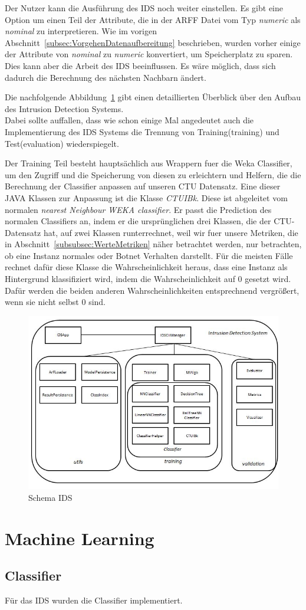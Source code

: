 \documentclass[main.tex]{subfiles}
\begin{document}
Der Nutzer kann die Ausführung des IDS noch weiter einstellen.
Es gibt eine Option um einen Teil der Attribute, die in der ARFF Datei vom Typ
\textit{numeric} als \textit{nominal} zu interpretieren.
Wie im vorigen Abschnitt~\ref{subsec:VorgehenDatenaufbereitung} beschrieben,
wurden vorher einige der Attribute von \textit{nominal} zu \textit{numeric}
konvertiert, um Speicherplatz zu sparen.
Dies kann aber die Arbeit des IDS beeinflussen.
Es wäre möglich, dass sich dadurch die Berechnung des nächsten Nachbarn ändert.

Die nachfolgende Abbildung~\ref{fig:schema_ids} gibt einen detaillierten Überblick über den Aufbau des Intrusion Detection Systems. \\
Dabei sollte auffallen, dass wie schon einige Mal angedeutet auch die
Implementierung des IDS Systems die Trennung von Training(training) und
Test(evaluation) wiederspiegelt.

Der Training Teil besteht hauptsächlich aus Wrappern fuer die Weka Classifier,
um den Zugriff und die Speicherung von diesen zu erleichtern und Helfern, die
die Berechnung der Classifier anpassen auf unseren CTU Datensatz.
Eine dieser JAVA Klassen zur Anpassung ist die Klasse \textit{CTUIBk}.
Diese ist abgeleitet vom normalen \textit{nearest Neighbour WEKA classifier}.
Er passt die Prediction des normalen Classifiers an, indem er die ursprünglichen
drei Klassen, die der CTU-Datensatz hat, auf zwei Klassen runterrechnet, weil
wir fuer unsere Metriken, die in Abschnitt~\ref{subsubsec:WerteMetriken} näher
betrachtet werden, nur betrachten, ob eine Instanz normales oder Botnet
Verhalten darstellt.
Für die meisten Fälle rechnet dafür diese Klasse die Wahrscheinlichkeit heraus,
dass eine Instanz als Hintergrund klassifiziert wird, indem die
Wahrscheinlichkeit auf $0$ gesetzt wird.
Dafür werden die beiden anderen Wahrscheinlichkeiten entsprechnend vergrößert, wenn
sie nicht selbst $0$ sind.

\begin{figure}[ht]
 \centering
 \includegraphics[width=1\textwidth]{images/Schema_IDS.jpg}
 \caption{Schema IDS}
 \label{fig:schema_ids}
\end{figure}

\section{Machine Learning}
\subsection{Classifier}
Für das IDS wurden die Classifier implementiert.
\end{document}
